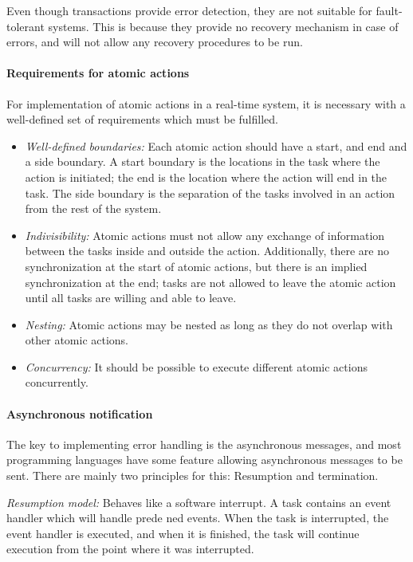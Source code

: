 Even though transactions provide error detection, they are not suitable for fault-tolerant systems. This is because they provide no recovery mechanism in case of errors, and will not allow any recovery procedures to be run.

\paragraph{Requirements for atomic actions} For implementation of atomic actions in a real-time system, it is necessary with a well-defined set of requirements which must be fulfilled.
\begin{itemize}
  \item \textit{Well-defined boundaries:} Each atomic action should have a start, and end and a side boundary. A start boundary is the locations in the task where the action is initiated; the end is the location where the action will end in the task. The side boundary is the separation of the tasks involved in an action from the rest of the system.
  \item \textit{Indivisibility:} Atomic actions must not allow any exchange of information between the tasks inside and outside the action. Additionally, there are no synchronization at the start of atomic actions, but there is an implied synchronization at the end; tasks are not allowed to leave the atomic action until all tasks are willing and able to leave.
  \item \textit{Nesting:} Atomic actions may be nested as long as they do not overlap with other atomic actions.
  \item \textit{Concurrency:} It should be possible to execute different atomic actions concurrently.
\end{itemize}

\paragraph{Asynchronous notification} The key to implementing error handling is the asynchronous messages, and most programming languages have some feature allowing asynchronous messages to be sent. There are mainly two principles for this: Resumption and termination.

\textit{Resumption model:} Behaves like a software interrupt. A task contains an event handler which will handle prede ned events. When the task is interrupted, the event handler is executed, and when it is finished, the task will continue execution from the point where it was interrupted.

